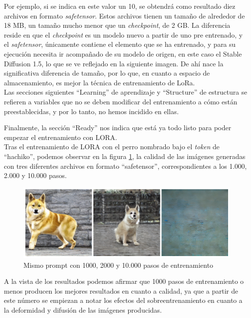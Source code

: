 Por ejemplo, si se indica en este valor un 10, se obtendrá como resultado diez archivos en formato \textit{safetensor}. Estos archivos tienen un tamaño de alrededor de 18 MB, un tamaño mucho menor que un \textit{checkpoint}, de 2 GB. La diferencia reside en que el \textit{checkpoint} es un modelo nuevo a partir de uno pre entrenado, y el \textit{safetensor}, únicamente contiene el elemento que se ha entrenado, y para su ejecución necesita ir acompañado de su modelo de origen, en este caso el Stable Diffusion 1.5, lo que se ve reflejado en la siguiente imagen. De ahí nace la significativa diferencia de tamaño, por lo que, en cuanto a espacio de almacenamiento, es mejor la técnica de entrenamiento de LoRa. \\


Las secciones siguientes ``Learning'' de aprendizaje y ``Structure'' de estructura se refieren a variables que no se deben modificar del entrenamiento a cómo están preestablecidas, y por lo tanto, no hemos incidido en ellas.

Finalmente, la sección ``Ready'' nos indica que está ya todo listo para poder empezar el entrenamiento con LORA. \\

Tras el entrenamiento de LORA con el perro nombrado bajo el \textit{token} de ``hachiko'', podemos observar en la figura \ref{fig:comphachi}, la calidad de las imágenes generadas con tres diferentes archivos en formato ``safetensor'', correspondientes a los 1.000, 2.000 y 10.000 pasos. 

\begin{figure}[!htb]
	\centering
	\includegraphics[width = 1
	\textwidth]{Imagenes/Vectorial/comparacion_hachiko.png}
	\caption{Mismo prompt con 1000, 2000 y 10.000 pasos de entrenamiento}
	\label{fig:comphachi}
\end{figure}

A la vista de los resultados podemos afirmar que 1000 pasos de entrenamiento o menos producen los mejores resultados en cuanto a calidad, ya que a partir de este número se empiezan a notar los efectos del sobreentrenamiento en cuanto a la deformidad y difusión de las imágenes producidas. \\

